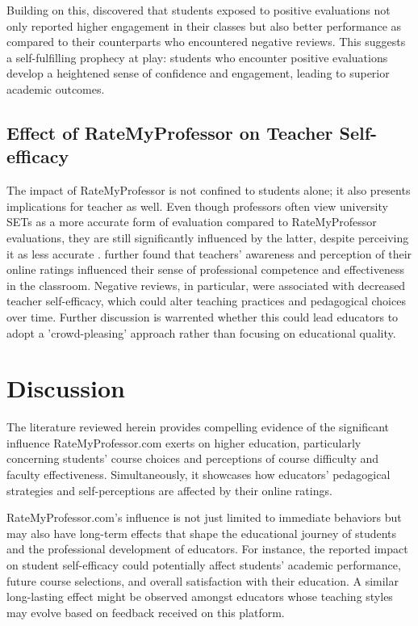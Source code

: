 \documentclass[man, 12pt]{apa7}
\begin{document}
Building on this, \textcite{reber_perceptual_2017} discovered that students exposed to positive evaluations not only reported higher engagement in their classes but also better performance as compared to their counterparts who encountered negative reviews. This suggests a self-fulfilling prophecy at play: students who encounter positive evaluations develop a heightened sense of confidence and engagement, leading to superior academic outcomes.

\subsection{Effect of RateMyProfessor on Teacher Self-efficacy}
The impact of RateMyProfessor is not confined to students alone; it also presents implications for teacher as well. Even though professors often view university SETs as a more accurate form of evaluation compared to RateMyProfessor evaluations, they are still significantly influenced by the latter, despite perceiving it as less accurate \textcite{boswell_ratemyprofessors_2016}. \textcite{boswell_ratemyprofessors_2016} further found that teachers' awareness and perception of their online ratings influenced their sense of professional competence and effectiveness in the classroom. Negative reviews, in particular, were associated with decreased teacher self-efficacy, which could alter teaching practices and pedagogical choices over time. Further discussion is warrented whether this could lead educators to adopt a 'crowd-pleasing' approach rather than focusing on educational quality.


\section{Discussion}

The literature reviewed herein provides compelling evidence of the significant influence RateMyProfessor.com exerts on higher education, particularly concerning students' course choices and perceptions of course difficulty and faculty effectiveness. Simultaneously, it showcases how educators' pedagogical strategies and self-perceptions are affected by their online ratings. 

RateMyProfessor.com's influence is not just limited to immediate behaviors but may also have long-term effects that shape the educational journey of students and the professional development of educators. For instance, the reported impact on student self-efficacy could potentially affect students' academic performance, future course selections, and overall satisfaction with their education. A similar long-lasting effect might be observed amongst educators whose teaching styles may evolve based on feedback received on this platform.
\end{document}
